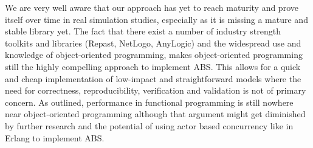 We are very well aware that our approach has yet to reach maturity and prove itself over time in real simulation studies, especially as it is missing a mature and stable library yet. The fact that there exist a number of industry strength toolkits and libraries (Repast, NetLogo, AnyLogic) and the widespread use and knowledge of object-oriented programming, makes object-oriented programming still the highly compelling approach to implement ABS. This allows for a quick and cheap implementation of low-impact and straightforward models where the need for correctness, reproducibility, verification and validation is not of primary concern. As outlined, performance in functional programming is still nowhere near object-oriented programming although that argument might get diminished by further research and the potential of using actor based concurrency like in Erlang to implement ABS. %